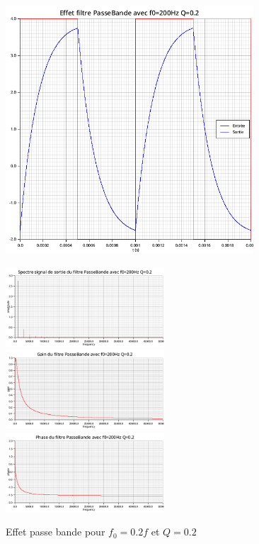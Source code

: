 \documentclass{article}
\begin{document}
\begin{figure}[H]
  \begin{minipage}{0.6\textwidth}
      \centering
      \includegraphics[width=25em]{images/creneau/bande/q=0.2/0.2/signals.png}
  \end{minipage}
  \begin{minipage}{0.3\textwidth}
      \centering
      \includegraphics[width=16em]{images/creneau/bande/q=0.2/0.2/fft_out.png}
      \vfill
      \includegraphics[width=16em]{images/creneau/bande/q=0.2/0.2/gain.png}
      \vfill
      \includegraphics[width=16em]{images/creneau/bande/q=0.2/0.2/phase.png}
  \end{minipage}
  \caption{Effet passe bande pour $f_0=0.2f$ et $Q=0.2$}
\end{figure}
\end{document}
